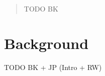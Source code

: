 \documentclass[twocolumn]{bmcart}%
\begin{document}
\begin{frontmatter}
\begin{abstractbox}
\begin{abstract}
  TODO BK


\end{abstract}


\begin{keyword}
\end{keyword}


\end{abstractbox}
%

\end{frontmatter}



\section*{Background}
TODO BK + JP (Intro + RW)
\end{document}
